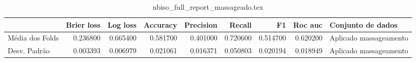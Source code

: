 \begin{table}
\centering
\caption{nbiso_full_report_massageado.tex}
\label{nbiso_full_report_massageado.tex}
\begin{tabular}{lrrrrrrrl}
\toprule
{} &  Brier  loss &  Log loss &  Accuracy  &  Precision  &   Recall  &       F1  &  Roc auc  &       Conjunto de dados \\
\midrule
Média dos Folds &     0.236800 &  0.665400 &   0.581700 &    0.401000 &  0.720600 &  0.514700 &  0.620200 &  Aplicado massageamento \\
Desv. Padrão    &     0.003393 &  0.006979 &   0.021061 &    0.016371 &  0.050803 &  0.020194 &  0.018949 &  Aplicado massageamento \\
\bottomrule
\end{tabular}
\end{table}
